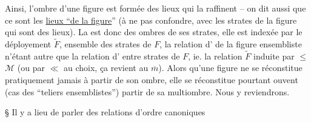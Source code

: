 Ainsi, l'ombre d'une figure est formée des lieux qui la raffinent -- on dit aussi que ce sont les \uline{lieux ``de la figure}'' (à ne pas confondre, avec les strates de la figure qui sont des lieux). La  est donc  des ombres de ses strates, elle est indexée par le déployement $\widetilde F$, ensemble des strates de $F$, la relation d' de la figure ensembliste n'étant autre que la relation d' entre strates de $F$, ie. la relation  $\widetilde F$ induite par $\leq$  $\mathcal M$ (ou par $\ll$ au choix, ça revient au $\overline m$). Alors qu'une figure ne se réconstitue pratiquement jamais à partir de son ombre, elle se réconstitue pourtant ouvent (cas des ``teliers ensemblistes'')  partir de sa multiombre. Nous y reviendrons.

\S{} Il y a lieu de parler des relations d'ordre canoniques
